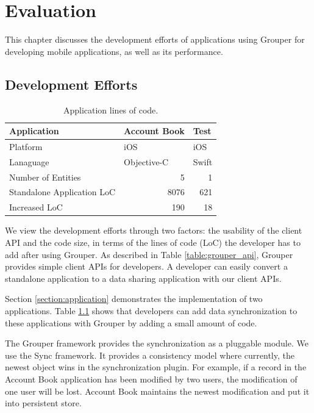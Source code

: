 \documentclass[a4paper,11pt]{report}
\begin{document}
\chapter{Evaluation} \label{chapter:evaluation}

This chapter discusses the development efforts of applications using Grouper for developing mobile applications, as well as its performance.

\section{Development Efforts} \label{section:development_efforts}

\begin{table}
	\centering
	\caption{Application lines of code.}
	\label{table:loc}
	\begin{tabular}{lll}
		\toprule
		\textbf{Application} & \textbf{Account Book} & \textbf{Test} \\ 
		\midrule
		Platform & iOS & iOS \\ 
		Lanaguage & Objective-C & Swift \\ 
		Number of Entities & \multicolumn{1}{r}{5} & \multicolumn{1}{r}{1} \\ 
		Standalone Application LoC & \multicolumn{1}{r}{8076} & \multicolumn{1}{r}{621} \\ 
		Increased LoC &  \multicolumn{1}{r}{190} &  \multicolumn{1}{r}{18} \\ 
		\bottomrule
	\end{tabular}
\end{table}

We view the development efforts through two factors: the usability of the client API and the code size, in terms of the lines of code (LoC) the developer has to add after using Grouper. 
As described in Table \ref{table:grouper_api}, Grouper provides simple client APIs for developers.
A developer can easily convert a standalone application to a data sharing application with our client APIs.

Section \ref{section:application} demonstrates the implementation of two applications.
Table \ref{table:loc} shows that developers can add data synchronization to these applications with Grouper by adding a small amount of code. 

The Grouper framework provides the synchronization as a pluggable module.
We use the Sync\cite{sync} framework.
It provides a consistency model where currently, the newest object wins in the synchronization plugin.
For example, if a record in the Account Book application has been modified by two users, the modification of one user will be lost.
Account Book maintains the newest modification and put it into persistent store.
\end{document}
